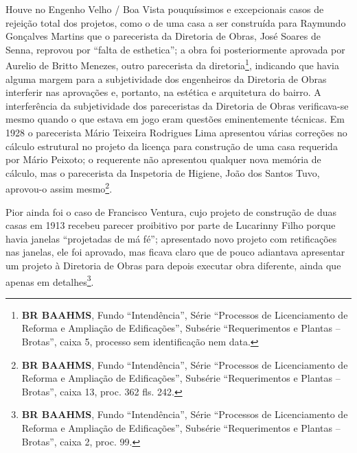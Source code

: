 Houve no Engenho Velho / Boa Vista pouquíssimos e excepcionais casos de rejeição total dos projetos, como o de uma casa a ser construída para Raymundo Gonçalves Martins que o parecerista da Diretoria de Obras, José Soares de Senna, reprovou por ``falta de esthetica''; a obra foi posteriormente aprovada por Aurelio de Britto Menezes, outro parecerista da diretoria\footnote{\textbf{BR BAAHMS}, Fundo ``Intendência'', Série ``Processos de Licenciamento de Reforma e Ampliação de Edificações'', Subsérie ``Requerimentos e Plantas – Brotas'', caixa 5, processo sem identificação nem data.}, indicando que havia alguma margem para a subjetividade dos engenheiros da Diretoria de Obras interferir nas aprovações e, portanto, na estética e arquitetura do bairro. A interferência da subjetividade dos pareceristas da Diretoria de Obras verificava-se mesmo quando o que estava em jogo eram questões eminentemente técnicas. Em 1928 o parecerista Mário Teixeira Rodrigues Lima apresentou várias correções no cálculo estrutural no projeto da licença para construção de uma casa requerida por Mário Peixoto; o requerente não apresentou qualquer nova memória de cálculo, mas o parecerista da Inspetoria de Higiene, João dos Santos Tuvo, aprovou-o assim mesmo\footnote{\textbf{BR BAAHMS}, Fundo ``Intendência'', Série ``Processos de Licenciamento de Reforma e Ampliação de Edificações'', Subsérie ``Requerimentos e Plantas – Brotas'', caixa 13, proc. 362 fls. 242.}. 

Pior ainda foi o caso de Francisco Ventura, cujo projeto de construção de duas casas em 1913 recebeu parecer proibitivo por parte de Lucarinny Filho porque havia janelas ``projetadas de má fé''; apresentado novo projeto com retificações nas janelas, ele foi aprovado, mas ficava claro que de pouco adiantava apresentar um projeto à Diretoria de Obras para depois executar obra diferente, ainda que apenas em detalhes\footnote{\textbf{BR BAAHMS}, Fundo ``Intendência'', Série ``Processos de Licenciamento de Reforma e Ampliação de Edificações'', Subsérie ``Requerimentos e Plantas – Brotas'', caixa 2, proc. 99.}.

